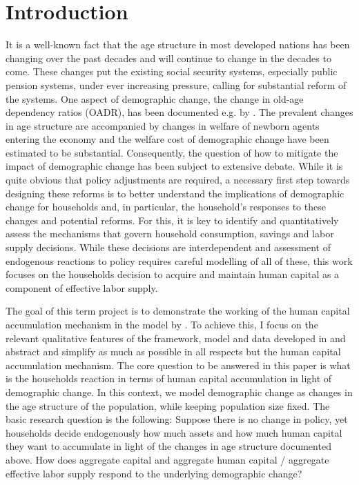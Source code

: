 \section{Introduction}
\label{sec:introduction}

It is a well-known fact that the age structure in most developed nations has been changing over the past decades and will continue to change in the decades to come. These changes put the existing social security systems, especially public pension systems, under ever increasing pressure, calling for substantial reform of the systems. One aspect of demographic change, the change in old-age dependency ratios (OADR), has been documented e.g. by \cite{LudwigSchelkleVogel2012}. The prevalent changes in age structure are accompanied by changes in welfare of newborn agents entering the economy and the welfare cost of demographic change have been estimated to be substantial. Consequently, the question of how to mitigate the impact of demographic change has been subject to extensive debate. While it is quite obvious that policy adjustments are required, a necessary first step towards designing these reforms is to better understand the implications of demographic change for households and, in particular, the household's responses to these changes and potential reforms. For this, it is key to identify and quantitatively assess the mechanisms that govern household consumption, savings and labor supply decisions. While these decisions are interdependent and assessment of endogenous reactions to policy requires careful modelling of all of these, this work focuses on the households decision to acquire and maintain human capital as a component of effective labor supply.

The goal of this term project is to demonstrate the working of the human capital accumulation mechanism in the model by \cite{LudwigSchelkleVogel2012}. To achieve this, I focus on the relevant qualitative features of the framework, model and data developed in \cite{LudwigSchelkleVogel2012} and abstract and simplify as much as possible in all respects but the human capital accumulation mechanism. The core question to be answered in this paper is what is the households reaction in terms of human capital accumulation in light of demographic change. In this context, we model demographic change as changes in the age structure of the population, while keeping population size fixed. The basic research question is the following: Suppose there is no change in policy, yet households decide endogenously how much assets and how much human capital they want to accumulate in light of the changes in age structure documented above. How does aggregate capital and aggregate human capital / aggregate effective labor supply respond to the underlying demographic change?

